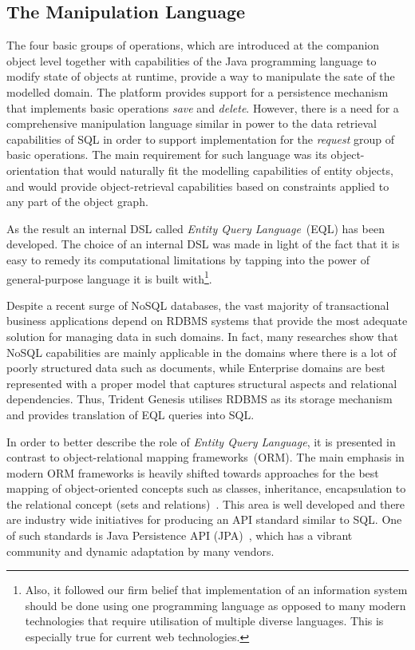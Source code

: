   \subsection{The Manipulation Language}

  The four basic groups of operations, which are introduced at the companion object level together with capabilities of the Java programming language to modify state of objects at runtime, provide a way to manipulate the sate of the modelled domain.
  The platform provides support for a persistence mechanism that implements basic operations \emph{save} and \emph{delete}.
  However, there is a need for a comprehensive manipulation language similar in power to the data retrieval capabilities of SQL in order to support implementation for the \emph{request} group of basic operations.
  The main requirement for such language was its object-orientation that would naturally fit the modelling capabilities of entity objects, and would provide object-retrieval capabilities based on constraints applied to any part of the object graph.

  As the result an internal DSL called \emph{Entity Query Language}~(EQL) has been developed.
  The choice of an internal DSL was made in light of the fact that it is easy to remedy its computational limitations by tapping into the power of general-purpose language it is built with\footnote{
  Also, it followed our firm belief that implementation of an information system should be done using one programming language as opposed to many modern technologies that require utilisation of multiple diverse languages.
  This is especially true for current web technologies.}.

  Despite a recent surge of NoSQL databases, the vast majority of transactional business applications depend on RDBMS systems that provide the most adequate solution for managing data in such domains.
  In fact, many researches show that NoSQL capabilities are mainly applicable in the domains where there is a lot of poorly structured data such as documents, while Enterprise domains are best represented with a proper model that captures structural aspects and relational dependencies.
  Thus, Trident Genesis utilises RDBMS as its storage mechanism and provides translation of EQL queries into SQL.

  In order to better describe the role of \emph{Entity Query Language}, it is presented in contrast to object-relational mapping frameworks~(ORM).
  The main emphasis in modern ORM frameworks is heavily shifted towards approaches for the best mapping of object-oriented concepts such as classes, inheritance, encapsulation to the relational concept (sets and relations)~\cite{Barnes:2007:ORM, HBBPB:2008}.
  This area is well developed and there are industry wide initiatives for producing an API standard similar to SQL.
  One of such standards is Java Persistence API (JPA)~\cite{DeMichiel:2012:JPA}, which has a vibrant community and dynamic adaptation by many vendors.
  
